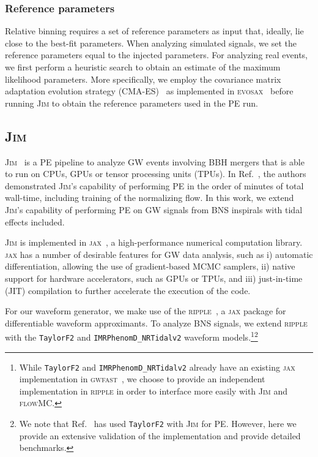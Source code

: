 \documentclass[prd,twocolumn,a4paper,floatfix,nofootinbib,preprintnumbers,superscriptaddress]{revtex4-1}
\begin{document}
\subsubsection{Reference parameters}
Relative binning requires a set of reference parameters as input that, ideally, lie close to the best-fit parameters. When analyzing simulated signals, we set the reference parameters equal to the injected parameters. For analyzing real events, we first perform a heuristic search to obtain an estimate of the maximum likelihood parameters. More specifically, we employ the covariance matrix adaptation evolution strategy (CMA-ES)~\cite{CMA_ES_reference_paper} as implemented in \textsc{evosax}~\cite{lange2022evosax} before running \textsc{Jim} to obtain the reference parameters used in the \ac{PE} run.

\subsection{\textsc{Jim}}

\textsc{Jim}~\cite{Wong:2023lgb} is a \ac{PE} pipeline to analyze \ac{GW} events involving \ac{BBH} mergers that is able to run on \ac{CPU}s, \ac{GPU}s or tensor processing units (TPUs). In Ref.~\cite{Wong:2023lgb}, the authors demonstrated \textsc{Jim}'s capability of performing \ac{PE} in the order of minutes of total wall-time, including training of the normalizing flow. In this work, we extend \textsc{Jim}'s capability of performing \ac{PE} on \ac{GW} signals from \ac{BNS} inspirals with tidal effects included.

\textsc{Jim} is implemented in \textsc{jax}~\cite{frostig2018compiling}, a high-performance numerical computation library. \textsc{jax} has a number of desirable features for \ac{GW} data analysis, such as i) automatic differentiation, allowing the use of gradient-based \ac{MCMC} samplers, ii) native support for hardware accelerators, such as \acp{GPU} or TPUs, and iii) just-in-time (JIT) compilation to further accelerate the execution of the code.

For our waveform generator, we make use of the \textsc{ripple}~\cite{Edwards:2023sak}, a \textsc{jax} package for differentiable waveform approximants. To analyze \ac{BNS} signals, we extend \textsc{ripple} with the \texttt{TaylorF2} and \texttt{IMRPhenomD\_NRTidalv2} waveform models.\footnote{While \texttt{TaylorF2} and \texttt{IMRPhenomD\_NRTidalv2} already have an existing \textsc{jax} implementation in \textsc{gwfast}~\cite{Iacovelli:2022mbg}, we choose to provide an independent implementation in \textsc{ripple} in order to interface more easily with \textsc{Jim} and \textsc{flowMC}.}\footnote{We note that Ref.~\cite{Chia:2023tle} has used \texttt{TaylorF2} with \textsc{Jim} for \ac{PE}. However, here we provide an extensive validation of the implementation and provide detailed benchmarks.}
\end{document}
